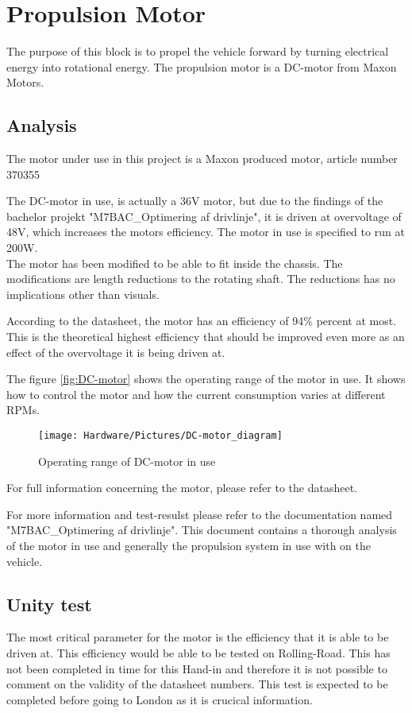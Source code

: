 \section{Propulsion Motor}
The purpose of this block is to propel the vehicle forward by turning electrical energy into rotational energy. The propulsion motor is a DC-motor from Maxon Motors. 

\subsection{Analysis}
The motor under use in this project is a Maxon produced motor, article number 370355 \cite{DC-Motor}

The DC-motor in use, is actually a 36V motor, but due to the findings of the bachelor projekt "M7BAC\_Optimering af drivlinje", it is driven at overvoltage of 48V, which increases the motors efficiency. The motor in use is specified to run at 200W.\\
The motor has been modified to be able to fit inside the chassis. The modifications are length reductions to the rotating shaft. The reductions has no implications other than visuals. 

According to the datasheet, the motor has an efficiency of 94\% percent at most. This is the theoretical highest efficiency that should be improved even more as an effect of the overvoltage it is being driven at. 

The figure \vref{fig:DC-motor} shows the operating range of the motor in use. It shows how to control the motor and how the current consumption varies at different RPMs.

\begin{figure}[H]
	\centering
	\texttt{[image: Hardware/Pictures/DC-motor\_diagram]}
	\caption{Operating range of DC-motor in use}
	\label{fig:DC-motor}
\end{figure}

For full information concerning the motor, please refer to the datasheet.

For more information and test-resulst please refer to the documentation named "M7BAC\_Optimering af drivlinje". This document contains a thorough analysis of the motor in use and generally the propulsion system in use with on the vehicle.  

\subsection{Unity test}
The most critical parameter for the motor is the efficiency that it is able to be driven at. This efficiency would be able to be tested on Rolling-Road. This has not been completed in time for this Hand-in and therefore it is not possible to comment on the validity of the datasheet numbers. This test is expected to be completed before going to London as it is crucical information. 

